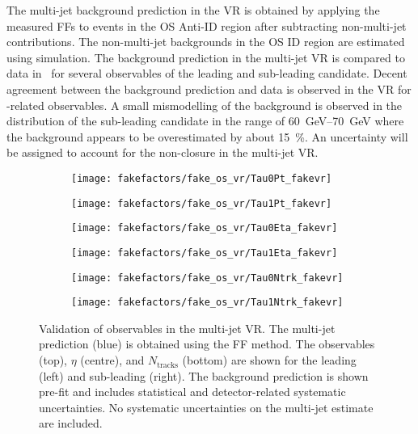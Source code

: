 The multi-jet background prediction in the VR is obtained by applying the
measured FFs to events in the OS Anti-ID region after subtracting non-multi-jet
contributions. The non-multi-jet backgrounds in the OS ID region are estimated
using simulation. The background prediction in the multi-jet VR is compared to
data in~ for several observables of the
leading and sub-leading \tauhadvis candidate. Decent agreement between the
background prediction and data is observed in the VR for \tauhadvis-related
observables. A small mismodelling of the background is observed in the \pT
distribution of the sub-leading \tauhadvis candidate in the range of
\SIrange{60}{70}{\GeV} where the background appears to be overestimated by about
\SI{15}{\percent}. An uncertainty will be assigned to account for the
non-closure in the multi-jet VR.

\begin{figure}[htbp]
  \centering

  \begin{subfigure}{0.44\textwidth}
    \texttt{[image: fakefactors/fake\_os\_vr/Tau0Pt\_fakevr]}
  \end{subfigure}\hspace*{0.04\textwidth}%
  \begin{subfigure}{0.44\textwidth}
    \texttt{[image: fakefactors/fake\_os\_vr/Tau1Pt\_fakevr]}
  \end{subfigure}

  \begin{subfigure}{0.44\textwidth}
    \texttt{[image: fakefactors/fake\_os\_vr/Tau0Eta\_fakevr]}
  \end{subfigure}\hspace*{0.04\textwidth}%
  \begin{subfigure}{0.44\textwidth}
    \texttt{[image: fakefactors/fake\_os\_vr/Tau1Eta\_fakevr]}
  \end{subfigure}

  \begin{subfigure}{0.44\textwidth}
    \texttt{[image: fakefactors/fake\_os\_vr/Tau0Ntrk\_fakevr]}
  \end{subfigure}\hspace*{0.04\textwidth}%
  \begin{subfigure}{0.44\textwidth}
    \texttt{[image: fakefactors/fake\_os\_vr/Tau1Ntrk\_fakevr]}
  \end{subfigure}

  \caption{Validation of \tauhadvis observables in the multi-jet VR. The
    multi-jet prediction (blue) is obtained using the FF method. The \tauhadvis
    observables \pT (top), $\eta$ (centre), and $N_{\text{tracks}}$ (bottom) are
    shown for the leading (left) and sub-leading \tauhadvis (right). The
    background prediction is shown pre-fit and includes statistical and
    detector-related systematic uncertainties. No systematic uncertainties on
    the multi-jet estimate are included.}%
  \label{fig:fake_factor_OSVR_kinematics}
\end{figure}

